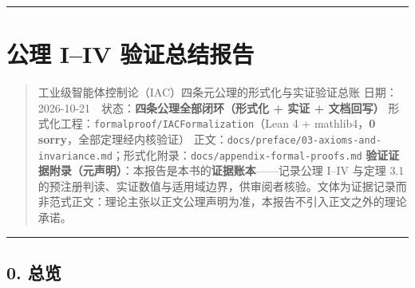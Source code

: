 \documentclass[
]{ctexart}
\renewcommand{\_}{\discretionary{}{}{\textunderscore}}
\let\oldsection\section
\renewcommand{\section}{\clearpage\oldsection}
\begin{document}
\begin{center}\rule{0.5\linewidth}{0.5pt}\end{center}

\section{公理 I--IV
验证总结报告}\label{ux516cux7406-iiv-ux9a8cux8bc1ux603bux7ed3ux62a5ux544a}

\begin{quote}
工业级智能体控制论（IAC）四条元公理的形式化与实证验证总账
日期：2026-10-21　状态：\textbf{四条公理全部闭环（形式化 + 实证 +
文档回写）} 形式化工程：\texttt{formal\_proof/IACFormalization}（Lean 4
+ mathlib4，\textbf{0 sorry}，全部定理经内核验证）
正文：\texttt{docs/preface/03-axioms-and-invariance.md}；形式化附录：\texttt{docs/appendix-formal-proofs.md}
\textbf{验证证据附录（元声明）}：本报告是本书的\textbf{证据账本}------记录公理
I--IV 与定理 3.1
的预注册判读、实证数值与适用域边界，供审阅者核验。文体为证据记录而非范式正文：理论主张以正文公理声明为准，本报告不引入正文之外的理论承诺。
\end{quote}

\begin{center}\rule{0.5\linewidth}{0.5pt}\end{center}

\subsection{0. 总览}\label{ux603bux89c8}
\end{document}
